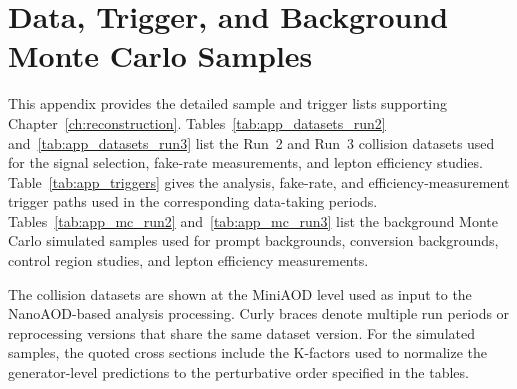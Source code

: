 \chapter{Data, Trigger, and Background Monte Carlo Samples}
\label{app:datasets}

This appendix provides the detailed sample and trigger lists supporting Chapter~\ref{ch:reconstruction}. Tables~\ref{tab:app_datasets_run2} and~\ref{tab:app_datasets_run3} list the Run~2 and Run~3 collision datasets used for the signal selection, fake-rate measurements, and lepton efficiency studies. Table~\ref{tab:app_triggers} gives the analysis, fake-rate, and efficiency-measurement trigger paths used in the corresponding data-taking periods. Tables~\ref{tab:app_mc_run2} and~\ref{tab:app_mc_run3} list the background Monte Carlo simulated samples used for prompt backgrounds, conversion backgrounds, control region studies, and lepton efficiency measurements.

The collision datasets are shown at the MiniAOD level used as input to the NanoAOD-based analysis processing. Curly braces denote multiple run periods or reprocessing versions that share the same dataset version. For the simulated samples, the quoted cross sections include the K-factors used to normalize the generator-level predictions to the perturbative order specified in the tables.

